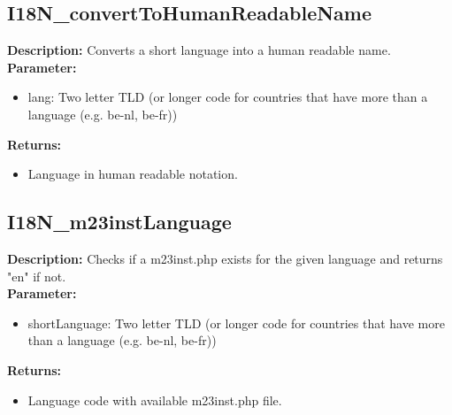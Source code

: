 \subsection{I18N\_convertToHumanReadableName}
\textbf{Description:} Converts a short language into a human readable name.\\
\textbf{Parameter:}
\begin{itemize}
\item lang: Two letter TLD (or longer code for countries that have more than a language (e.g. be-nl, be-fr))
\end{itemize}
\textbf{Returns:}
\begin{itemize}
\item Language in human readable notation.
\end{itemize}

\subsection{I18N\_m23instLanguage}
\textbf{Description:} Checks if a m23inst.php exists for the given language and returns "en" if not.\\
\textbf{Parameter:}
\begin{itemize}
\item shortLanguage: Two letter TLD (or longer code for countries that have more than a language (e.g. be-nl, be-fr))
\end{itemize}
\textbf{Returns:}
\begin{itemize}
\item Language code with available m23inst.php file.
\end{itemize}

